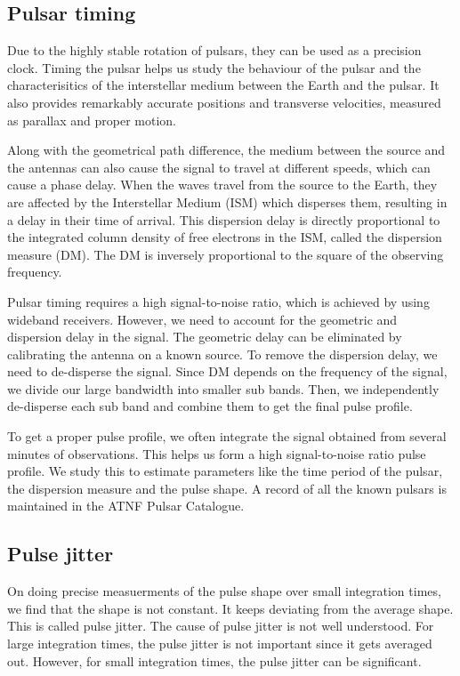 \documentclass{article_saj}
\begin{document}
\subsection{Pulsar timing}
Due to the highly stable rotation of pulsars, they can be used as a precision clock. Timing the pulsar helps us study the behaviour of the pulsar and the characterisitics of the interstellar medium between the Earth and the pulsar. It also provides remarkably accurate positions and transverse velocities, measured as parallax and proper motion. 

Along with the geometrical path difference, the medium between the source and the antennas can also cause the signal to travel at different speeds, which can cause a phase delay. When the waves travel from the source to the Earth, they are affected by the Interstellar Medium (ISM) which disperses them, resulting in a delay in their time of arrival. This dispersion delay is directly proportional to the integrated column density of free electrons in the ISM, called the dispersion measure (DM). The DM is inversely proportional to the square of the observing frequency.

Pulsar timing requires a high signal-to-noise ratio, which is achieved by using wideband receivers. However, we need to account for the geometric and dispersion delay in the signal. The geometric delay can be eliminated by calibrating the antenna on a known source. To remove the dispersion delay, we need to de-disperse the signal. Since DM depends on the frequency of the signal, we divide our large bandwidth into smaller sub bands. Then, we independently de-disperse each sub band and combine them to get the final pulse profile.

To get a proper pulse profile, we often integrate the signal obtained from several minutes of observations. This helps us form a high signal-to-noise ratio pulse profile. We study this to estimate parameters like the time period of the pulsar, the dispersion measure and the pulse shape. A record of all the known pulsars is maintained in the ATNF Pulsar Catalogue.

\subsection{Pulse jitter}
On doing precise measuerments of the pulse shape over small integration times, we find that the shape is not constant. It keeps deviating from the average shape. This is called pulse jitter. The cause of pulse jitter is not well understood. For large integration times, the pulse jitter is not important since it gets averaged out. However, for small integration times, the pulse jitter can be significant.
\end{document}
